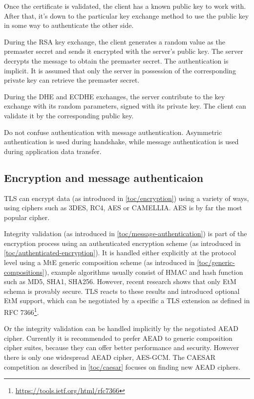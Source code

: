Once the certificate is validated, the client has a known public key to work with. After that, it's down to the particular key exchange method to use the public key in some way to authenticate the other side.

During the RSA key exchange, the client generates a random value as the premaster secret and sends it encrypted with the server's public key. The server decrypts the message to obtain the premaster secret. The authentication is implicit. It is assumed that only the server in possession of the corresponding private key can retrieve the premaster secret.

During the DHE and ECDHE exchanges, the server contribute to the key exchange with its random parameters, signed with its private key. The client can validate it by the corresponding public key.

Do not confuse authentication with message authentication. Asymmetric authentication is used during handshake, while message authentication is used during application data transfer.

\subsection{Encryption and message authenticaion}

TLS can encrypt data (as introduced in \autoref{toc/encryption}) using a variety of ways, using ciphers such as 3DES, RC4, AES or CAMELLIA. AES is by far the most popular cipher.

Integrity validation (as introduced in \autoref{toc/message-authentication}) is part of the encryption process using an authenticated encryption scheme (as introduced in \autoref{toc/authenticated-encryption}). It is handled either explicitly at the protocol level using a MtE generic composition scheme (as introduced in \autoref{toc/generic-compositions}), example algorithms usually consist of HMAC and hash function such as MD5, SHA1, SHA256. However, recent research shows that only EtM schema is provably secure. TLS reacts to these results and introduced optional EtM support, which can be negotiated by a specific a TLS extension as defined in RFC 7366\footnote{\url{https://tools.ietf.org/html/rfc7366}}.

Or the integrity validation can be handled implicitly by the negotiated AEAD cipher. Currently it is recommended to prefer AEAD to generic composition cipher suites, because they can offer better performance and security. However there is only one widespread AEAD cipher, AES-GCM. The CAESAR competition as described in \autoref{toc/caesar} focuses on finding new AEAD ciphers.

